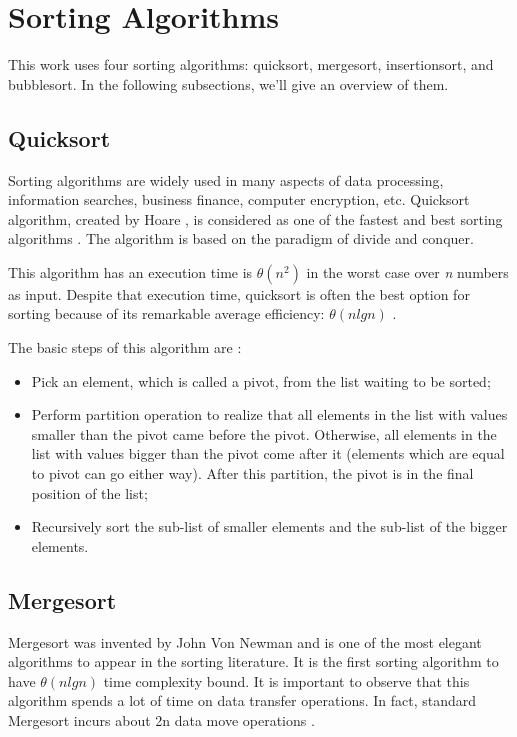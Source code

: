 \section{Sorting Algorithms}

This work uses four sorting algorithms: quicksort, mergesort, insertionsort, and bubblesort. In the following subsections, we'll give an overview of them.

\subsection{Quicksort}

Sorting algorithms are widely used in many aspects of data processing, information searches, business finance, computer encryption, etc. Quicksort algorithm, created by Hoare \cite{Hoare1962}, is considered as one of the fastest and best sorting algorithms \cite{Wang2011}. The algorithm is based on the paradigm of divide and conquer.

This algorithm has an execution time is $\theta(n^2)$ in the worst case over \textit{n} numbers as input. Despite that execution time, quicksort is often the best option for sorting because of its remarkable average efficiency: $\theta(n lg n)$ \cite{Cormen2009}.

The basic steps of this algorithm are \cite{Wang2011}:
\begin{itemize}
    \item Pick an element, which is called a pivot, from the list waiting to be sorted;
    \item Perform partition operation to realize that all elements in the list with values smaller than the pivot came before the pivot. Otherwise, all elements in the list with values bigger than the pivot come after it (elements which are equal to pivot can go either way). After this partition, the pivot is in the final position of the list;
    \item Recursively sort the sub-list of smaller elements and the sub-list of the bigger elements.
\end{itemize}

\subsection{Mergesort}

Mergesort was invented by John Von Newman and is one of the most elegant algorithms to appear in the sorting literature. It is the first sorting algorithm to have $\theta(n lg n)$ time complexity bound. It is important to observe that this algorithm spends a lot of time on data transfer operations. In fact, standard Mergesort incurs about 2n data move operations \cite{Abhyankar2011}.

